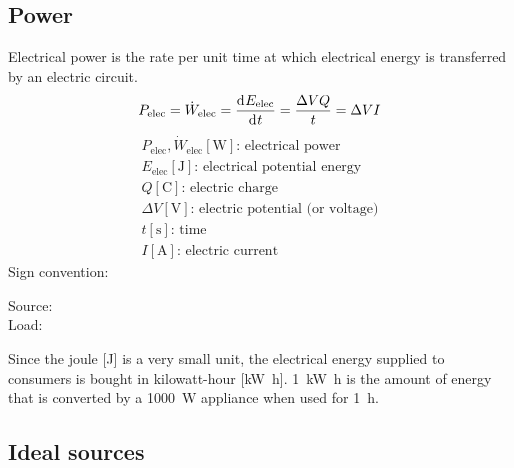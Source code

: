 \documentclass[10pt, twocolumn]{article}
\begin{document}
\subsection{Power}
Electrical power is the rate per unit time at which electrical energy is transferred by an electric circuit.
\[
  P_\mathrm{elec} = \dot{W}_\mathrm{elec} = \frac{\mathrm{d}^{} E_\mathrm{elec}}{\mathrm{d}^{} t} = \frac{\Delta VQ}{t} = \Delta VI
\]
\[
  \begin{array}{|l}
    P_\mathrm{elec}, \dot{W}_\mathrm{elec} [\si{\watt}] \text{: electrical power} \\
    E_\mathrm{elec} [\si{\joule}] \text{: electrical potential energy}            \\
    Q [\si{\coulomb}] \text{: electric charge}                                    \\
    \Delta V [\si{\volt}] \text{: electric potential (or voltage)}                \\
    t [\si{\second}] \text{: time}                                                \\
    I [\si{\ampere}] \text{: electric current}
  \end{array}
\]
Sign convention:
\begin{description}
  \item[Source:]
  \item[Load:]
\end{description}

\begin{remark}
  Since the joule [\si{\joule}] is a very small unit, the electrical energy supplied to consumers is bought in kilowatt-hour [\si{\kilo\watt\hour}].
  \SI{1}{\kilo\watt\hour} is the amount of energy that is converted by a \SI[scientific-notation = false]{1000}{\watt} appliance when used for \SI{1}{\hour}.
\end{remark}


\subsection{Ideal sources}
\end{document}
